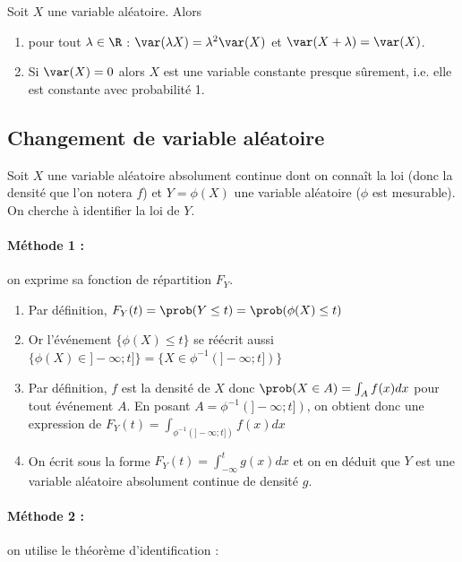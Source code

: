 \begin{proposition}{}{}
	Soit $X$ une variable aléatoire. Alors
	\begin{enumerate}
		\item pour tout $\lambda \in \R $ :  $\var(\lambda X)= \lambda^2 \var(X)$ et $\var(X+\lambda)=\var(X)$.
		\item Si $\var(X)=0$ alors $X$ est une variable constante presque sûrement, i.e. elle est constante avec probabilité 1.
	\end{enumerate}
\end{proposition}



\subsection{Changement de variable aléatoire}

Soit $X$ une variable aléatoire absolument continue dont on connaît la loi (donc la densité que l'on notera $f$) et $Y=\phi(X)$ une variable aléatoire ($\phi$ est mesurable). On cherche à identifier la loi de $Y$. 

\paragraph{Méthode 1 :} on exprime sa fonction de répartition $F_Y$.

\begin{enumerate}
	\item Par définition, $F_Y(t)= \prob(Y \leq t) = \prob(\phi(X) \leq t)$
	\item Or l'événement $\{\phi(X) \leq t\}$ se réécrit aussi $\{\phi(X) \in ]-\infty;t]\} =  \{X \in \phi^{-1}(]-\infty;t])\}$
	\item Par définition, $f$ est la densité de $X$ donc $\prob(X \in A) = \int_A f(x)dx$ pour tout événement $A$. En posant $A = \phi^{-1}(]-\infty;t])$, on obtient donc une expression de $F_Y(t) = \int_{\phi^{-1}(]-\infty;t])} f(x)dx$
	\item On écrit sous la forme $F_Y(t)= \int_{-\infty}^{t}g(x)dx$ et on en déduit que $Y$ est une variable aléatoire absolument continue de densité $g$.
\end{enumerate}

	
\paragraph{Méthode 2 :} on utilise le théorème d'identification :
	
